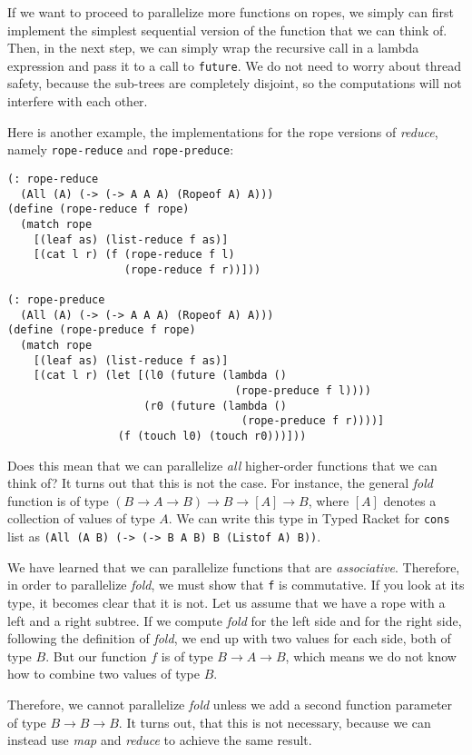 \documentclass{article}
\begin{document}
If we want to proceed to parallelize more functions on ropes, we simply can first implement the simplest sequential version of the function that we can think of. Then, in the next step, we can simply wrap the recursive call in a lambda expression and pass it to a call to \lstinline{future}. We do not need to worry about thread safety, because the sub-trees are completely disjoint, so the computations will not interfere with each other.

Here is another example, the implementations for the rope versions of \emph{reduce}, namely \lstinline{rope-reduce} and \lstinline{rope-preduce}:

\begin{lstlisting}
(: rope-reduce
  (All (A) (-> (-> A A A) (Ropeof A) A)))
(define (rope-reduce f rope)
  (match rope
    [(leaf as) (list-reduce f as)]
    [(cat l r) (f (rope-reduce f l)
                  (rope-reduce f r))]))

(: rope-preduce
  (All (A) (-> (-> A A A) (Ropeof A) A)))
(define (rope-preduce f rope)
  (match rope
    [(leaf as) (list-reduce f as)]
    [(cat l r) (let [(l0 (future (lambda ()
                                   (rope-preduce f l))))
                     (r0 (future (lambda ()
                                    (rope-preduce f r))))]
                 (f (touch l0) (touch r0)))]))
\end{lstlisting}

Does this mean that we can parallelize \emph{all} higher-order functions that we can think of? It turns out that this is not the case. For instance, the general \emph{fold} function is of type $(B \rightarrow A \rightarrow B) \rightarrow B \rightarrow [A] \rightarrow B$, where $[A]$ denotes a collection of values of type $A$. We can write this type in Typed Racket for \lstinline{cons} list as \lstinline{(All (A B) (-> (-> B A B) B (Listof A) B))}.

We have learned that we can parallelize functions that are \emph{associative}. Therefore, in order to parallelize \emph{fold}, we must show that \lstinline{f} is commutative. If you look at its type, it becomes clear that it is not. Let us assume that we have a rope with a left and a right subtree. If we compute \emph{fold} for the left side and for the right side, following the definition of \emph{fold}, we end up with two values for each side, both of type $B$. But our function $f$ is of type $B \rightarrow A \rightarrow B$, which means we do not know how to combine two values of type $B$.

Therefore, we cannot parallelize \emph{fold} unless we add a second function parameter of type $B \rightarrow B \rightarrow B$. It turns out, that this is not necessary, because we can instead use \emph{map} and \emph{reduce} to achieve the same result.



\end{document}
